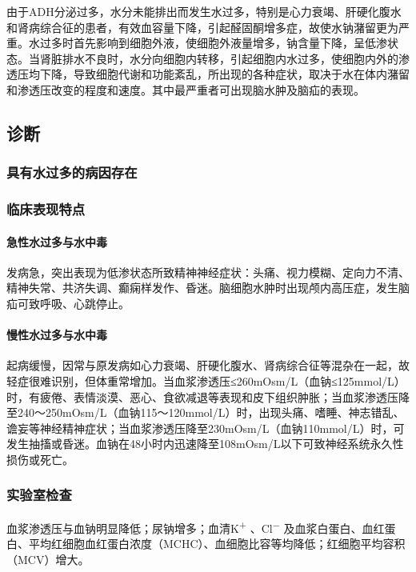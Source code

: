 由于ADH分泌过多，水分未能排出而发生水过多，特别是心力衰竭、肝硬化腹水和肾病综合征的患者，有效血容量下降，引起醛固酮增多症，故使水钠潴留更为严重。水过多时首先影响到细胞外液，使细胞外液量增多，钠含量下降，呈低渗状态。当肾脏排水不良时，水分向细胞内转移，引起细胞内水过多，使细胞内外的渗透压均下降，导致细胞代谢和功能紊乱，所出现的各种症状，取决于水在体内潴留和渗透压改变的程度和速度。其中最严重者可出现脑水肿及脑疝的表现。

\subsection{诊断}

\subsubsection{具有水过多的病因存在}

\subsubsection{临床表现特点}

\paragraph{急性水过多与水中毒}

发病急，突出表现为低渗状态所致精神神经症状：头痛、视力模糊、定向力不清、精神失常、共济失调、癫痫样发作、昏迷。脑细胞水肿时出现颅内高压症，发生脑疝可致呼吸、心跳停止。

\paragraph{慢性水过多与水中毒}

起病缓慢，因常与原发病如心力衰竭、肝硬化腹水、肾病综合征等混杂在一起，故轻症很难识别，但体重常增加。当血浆渗透压≤260mOsm/L（血钠≤125mmol/L）时，有疲倦、表情淡漠、恶心、食欲减退等表现和皮下组织肿胀；当血浆渗透压降至240～250mOsm/L（血钠115～120mmol/L）时，出现头痛、嗜睡、神志错乱、谵妄等神经精神症状；当血浆渗透压降至230mOsm/L（血钠110mmol/L）时，可发生抽搐或昏迷。血钠在48小时内迅速降至108mOsm/L以下可致神经系统永久性损伤或死亡。

\subsubsection{实验室检查}

血浆渗透压与血钠明显降低；尿钠增多；血清K\textsuperscript{+}
、Cl\textsuperscript{−}
及血浆白蛋白、血红蛋白、平均红细胞血红蛋白浓度（MCHC）、血细胞比容等均降低；红细胞平均容积（MCV）增大。

